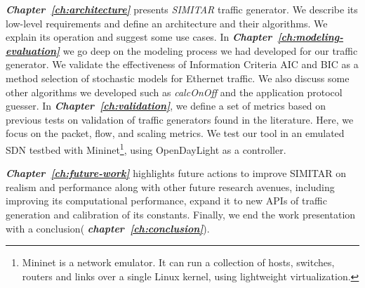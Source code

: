 \textit{\textbf{Chapter~\ref{ch:architecture}}} presents \textit{SIMITAR} traffic generator. We describe its low-level requirements and define an architecture and their algorithms.  We explain its operation and suggest some use cases. In \textit{\textbf{Chapter~\ref{ch:modeling-evaluation}}} we go deep on the modeling process we had developed for our traffic generator. We validate the effectiveness of Information Criteria \acrfull{AIC} and \acrfull{BIC} as a method selection of stochastic models for  Ethernet traffic.  We also discuss some other algorithms we developed such as \textit{calcOnOff} and the application protocol guesser. In \textit{\textbf{Chapter~\ref{ch:validation}}}, we define a set of metrics based on previous tests on validation of traffic generators found in the literature. Here, we focus on the packet, flow, and scaling metrics. We test our tool in an emulated SDN testbed with Mininet\cite{web-mininet}\footnote{Mininet is a network emulator. It can run a collection of  hosts, switches, routers and links over a single Linux kernel, using lightweight virtualization\cite{web-mininet-repo}.}, using OpenDayLight\cite{web-opendaylight} as a controller. 

\textit{\textbf{Chapter~\ref{ch:future-work}}}  highlights future actions to improve SIMITAR on realism and performance along with other future research avenues, including improving its computational performance, expand it to new APIs of traffic generation and calibration of its constants. Finally, we end the work presentation with a conclusion( \textit{\textbf{chapter~\ref{ch:conclusion}}}).